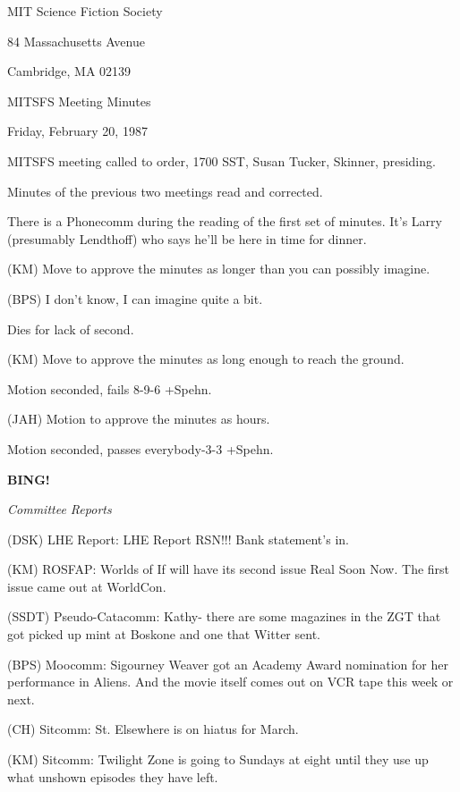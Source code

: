 \documentclass[12pt]{article}
\newcommand{\bing}{{\bf BING!} }
\newcommand{\goto}[1]{\bing \vskip 12pt \centerline{{\em{#1}}}}
\begin{document}
\begin{center}

MIT Science Fiction Society 

84 Massachusetts Avenue

Cambridge, MA 02139

\vspace{12pt}

MITSFS Meeting Minutes 

Friday, February 20, 1987

\end{center}
 
\vspace{18pt}

\setlength{\parskip}{6pt}

\noindent
MITSFS meeting called to order, 1700 SST,
Susan Tucker, Skinner, presiding.

Minutes of the previous two meetings read and corrected.

There is a Phonecomm during the reading of the first set of minutes. It's Larry (presumably Lendthoff) who says he'll be here in time for dinner.

(KM) Move to approve the minutes as longer than you can possibly imagine.

(BPS) I don't know, I can imagine quite a bit.

Dies for lack of second.

(KM) Move to approve the minutes as long enough to reach the ground.

Motion seconded, fails 8-9-6 +Spehn.

(JAH) Motion to approve the minutes as hours.

Motion seconded, passes everybody-3-3 +Spehn.

\goto{Committee Reports}

(DSK) LHE Report: LHE Report RSN!!! Bank statement's in.

(KM) ROSFAP: Worlds of If will have its second issue Real Soon Now. The first issue came out at WorldCon.

(SSDT) Pseudo-Catacomm: Kathy- there are some magazines in the ZGT that got picked up mint at Boskone and one that Witter sent.

(BPS) Moocomm: Sigourney Weaver got an Academy Award nomination for her performance in Aliens. And the movie itself comes out on VCR tape this week or next.

(CH) Sitcomm: St. Elsewhere is on hiatus for March.

(KM) Sitcomm: Twilight Zone is going to Sundays at eight until they use up what unshown episodes they have left.
\end{document}
